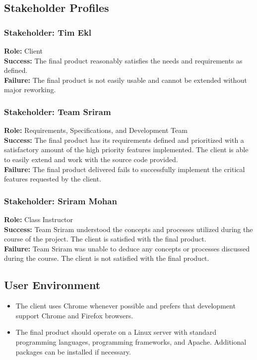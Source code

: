\documentclass{article}
\begin{document}
\subsection{Stakeholder Profiles}

\subsubsection{Stakeholder: Tim Ekl}
\textbf{Role:} Client\\
\textbf{Success:} The final product reasonably satisfies the needs and requirements as defined.\\
\textbf{Failure:} The final product is not easily usable and cannot be extended without major reworking.

\subsubsection{Stakeholder: Team Sriram}
\textbf{Role:} Requirements, Specifications, and Development Team\\
\textbf{Success:} The final product has its requirements defined and prioritized with a satisfactory amount of the high priority features implemented.  The client is able to easily extend and work with the source code provided.\\
\textbf{Failure:} The final product delivered fails to successfully implement the critical features requested by the client.

\subsubsection{Stakeholder: Sriram Mohan}
\textbf{Role:} Class Instructor\\
\textbf{Success:} Team Sriram understood the concepts and processes utilized during the course of the project. The client is satisfied with the final product.\\
\textbf{Failure:} Team Sriram was unable to deduce any concepts or processes discussed during the course. The client is not satisfied with the final product.

\subsection{User Environment}
\begin{itemize}
\item The client uses Chrome whenever possible and prefers that development support Chrome and Firefox browsers.
\item The final product should operate on a Linux server with standard programming languages, programming frameworks, and Apache.  Additional packages can be installed if necessary.
\end{itemize}
\end{document}
